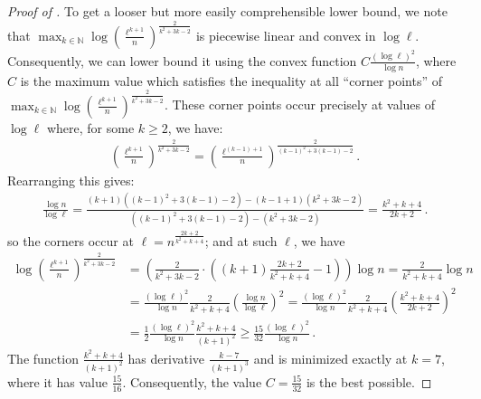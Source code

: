 \documentclass[10pt,a4paper]{article}
\theoremstyle{definition}
\theoremstyle{remark}
\newcommand{\NN}{\mathbb{N}}
\newcommand{\rl}{\mathbf{\ell}}             %
\begin{document}
\begin{itemize}
\begin{itemize}
\begin{proof}[Proof of ]
  To get a looser but more easily comprehensible lower bound, we note that $\max_{k \in \NN} \log \left(\frac{\rl^{k + 1}}{n}\right)^{\frac{2}{k^2 + 3 k - 2}}$ is piecewise linear and convex in $\log \rl$. Consequently,
  we can lower bound it using the convex function $C \frac{(\log \rl)^2}{\log n}$, where $C$ is the maximum value which satisfies the inequality at all ``corner points'' of $\max_{k \in \NN} \log \left(\frac{\rl^{k + 1}}{n}\right)^{\frac{2}{k^2 + 3 k - 2}}$. These corner points occur precisely at values of $\log \rl$ where, for some $k \ge 2$, we have:
  \begin{align*}
    \left(\frac{\rl^{k + 1}}{n}\right)^{\frac{2}{k^2 + 3 k - 2}} = \left(\frac{\rl^{(k-1) + 1}}{n}\right)^{\frac{2}{(k-1)^2 + 3 (k-1) - 2}} \,.
  \end{align*}
  Rearranging this gives:
  \begin{align*}
    \frac{\log n}{\log \rl} = \frac{(k+1) ((k-1)^2 + 3 (k-1) - 2) - (k-1+1) (k^2 + 3 k - 2)}{((k-1)^2 + 3 (k-1) - 2) - (k^2 + 3 k - 2)} = \frac{k^2 + k + 4}{2k + 2} \,.
  \end{align*}
  so the corners occur at $\rl = n^{\frac{2k + 2}{k^2 + k + 4}}$; and at such $\rl$, we have
  \begin{align*}
    \log \left(\frac{\rl^{k + 1}}{n}\right)^{\frac{2}{k^2 + 3 k - 2}} 
    &= \left(\frac{2}{k^2 + 3 k - 2} \cdot ((k+1) \frac{2 k + 2}{k^2 + k + 4} - 1)\right) \log n = \frac{2}{k^2 + k + 4} \log n \\
      &= \frac{(\log \rl)^2}{\log n} \frac{2}{k^2 + k + 4} \left(\frac{\log n}{\log \rl}\right)^2 = \frac{(\log \rl)^2}{\log n} \frac{2}{k^2 + k + 4} \left(\frac{k^2 + k + 4}{2k + 2}\right)^2 \\
      &= \frac{1}{2} \frac{(\log \rl)^2}{\log n} \frac{k^2 + k + 4}{(k+1)^2} \ge \frac{15}{32} \frac{(\log \rl)^2}{\log n} \,.
  \end{align*}
  The function $\frac{k^2 + k + 4}{(k+1)^2}$ has derivative $\frac{k-7}{(k+1)^3}$ and is minimized exactly at $k = 7$, where it has value $\frac{15}{16}$. Consequently, the value $C = \frac{15}{32}$ is the best possible.
\end{proof}


\end{itemize}
\end{itemize}
\end{document}
